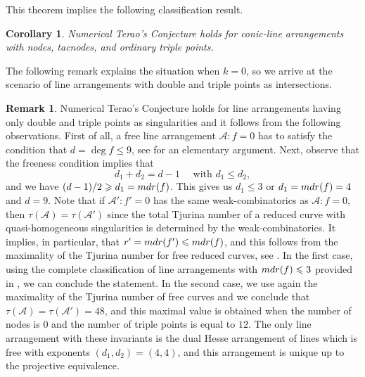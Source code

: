 \documentclass[12pt]{article}
\theoremstyle{plain}
\newtheorem{corollary}[thm]{Corollary}
\theoremstyle{definition}
\newtheorem{remark}[thm]{Remark}
\renewcommand\geq{\geqslant}
\renewcommand\leq{\leqslant}
\begin{document}
This theorem implies the following classification result.
\begin{corollary}
\label{cor5}
Numerical Terao's Conjecture holds for conic-line arrangements with nodes, tacnodes, and ordinary triple points.
\end{corollary}
The following remark explains the situation when $k=0$, so we arrive at the scenario of line arrangements with double and triple points as intersections.
\begin{remark}
Numerical Terao's Conjecture holds for line arrangements having only double and triple points as singularities and it follows from the following observations. First of all, a free line arrangement $\mathcal{A}: f=0$ has to satisfy the condition that $d = \deg f \leq 9$, see \cite{Kabat} for an elementary argument. Next, observe that the freeness condition implies that
$$d_{1} + d_{2} = d - 1 \quad \text{ with } d_{1} \leq d_{2},$$
and we have 
$(d-1)/2 \geq d_1 = {\rm mdr}(f)$. This gives us $d_{1} \leq 3$ or
$d_1= {\rm mdr}(f) = 4$ and $d=9$. Note that if $\mathcal{A}':f'=0$ has the same weak-combinatorics as $\mathcal{A} :f=0$, then $\tau(\mathcal{A})=\tau(\mathcal{A}')$ since the total Tjurina number of a reduced curve with quasi-homogeneous singularities is determined by the weak-combinatorics. It implies, in particular, that
$r'= {\rm mdr}(f') \leq {\rm mdr}(f)$, and this follows from the maximality of the Tjurina number for free reduced curves, see \cite{duP}.
In the first case, using the complete classification of line arrangements with ${\rm mdr}(f) \leq 3$ provided in \cite{BT}, we can conclude the statement. In the second case, we use again the maximality of the Tjurina number of free curves \cite{duP} and we conclude that $\tau(\mathcal{A})=\tau(\mathcal{A}')=48$, and this maximal value is obtained when the number of nodes is $0$ and the number of triple points is equal to $12$. The only line arrangement with these invariants is the dual Hesse arrangement of lines which is free with exponents $(d_{1},d_{2}) = (4,4)$, and this arrangement is unique up to the projective equivalence.
\end{remark}
\end{document}
